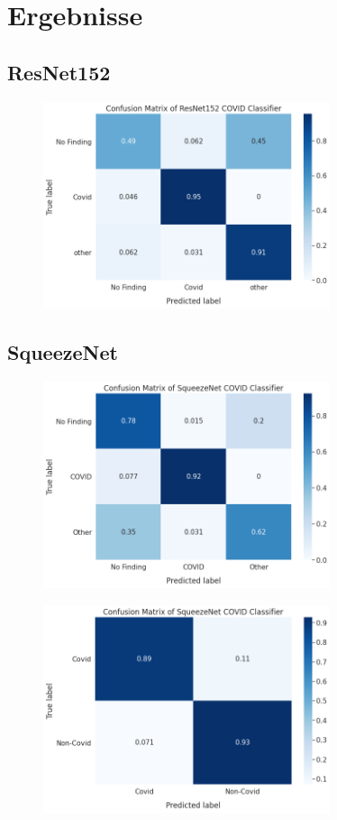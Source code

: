 \chapter{Ergebnisse}
\label{ch:results}

\section{ResNet152}

\begin{figure}[H]
    \centering
    \includegraphics[width=0.75\textwidth]{../results/ResNet152_conf_matrix.png}
    \caption{}
\end{figure}

\section{SqueezeNet}

\begin{figure}[H]
    \centering
    \includegraphics[width=0.75\textwidth]{../results/SqueezeNet_conf_matrix.png}
    \caption{}
\end{figure}

\begin{figure}[H]
    \centering
    \includegraphics[width=0.75\textwidth]{../results/Binary_SqueezeNet_conf_matrix.png}
    \caption{}
\end{figure}